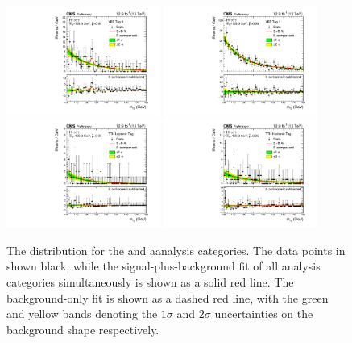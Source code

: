 \begin{figure}[ht!]
\centering
\includegraphics[width=0.45\textwidth]{statandresultsFigures/S_SB_ProfileMH_VBFTag_0_13TeV.pdf} 
\includegraphics[width=0.45\textwidth]{statandresultsFigures/S_SB_ProfileMH_VBFTag_1_13TeV.pdf} 
\includegraphics[width=0.45\textwidth]{statandresultsFigures/S_SB_ProfileMH_TTHLeptonicTag_13TeV.pdf} 
\includegraphics[width=0.45\textwidth]{statandresultsFigures/S_SB_ProfileMH_TTHHadronicTag_13TeV.pdf} \\
\caption{The \mgg distribution for the and \VBFTag a\TTHTag analysis categories. The data points in shown black, while the signal-plus-background fit of all analysis categories simultaneously is shown as a solid red line. The background-only fit is shown as a dashed red line, with the green and yellow bands denoting the $1\sigma$ and $2\sigma$ uncertainties on the background shape respectively.}


\end{figure}
